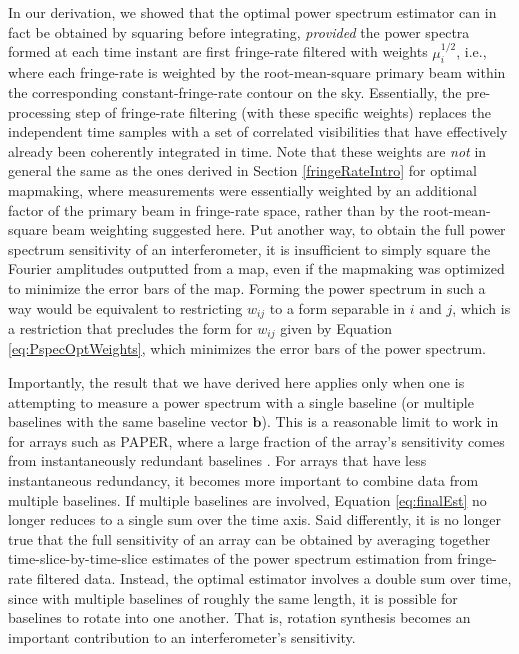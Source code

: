 \documentclass[twocolumn,apj,numberedappendix]{emulateapj}
\begin{document}
In our derivation, we showed that the optimal power spectrum estimator can in fact be obtained by squaring before integrating, \emph{provided} the power spectra formed at each time instant are first fringe-rate filtered with weights $ \mu_i^{1/2}$, i.e., where each fringe-rate is weighted by the root-mean-square primary beam within the corresponding constant-fringe-rate contour on the sky. Essentially, the pre-processing step of fringe-rate filtering (with these specific weights) replaces the independent time samples with a set of correlated visibilities that have effectively already been coherently integrated in time. Note that these weights are \emph{not} in general the same as the ones derived in Section \ref{fringeRateIntro} for optimal mapmaking, where measurements were essentially weighted by an additional factor of the primary beam in fringe-rate space, rather than by the root-mean-square beam weighting suggested here. Put another way, to obtain the full power spectrum sensitivity of an interferometer, it is insufficient
to simply square the Fourier amplitudes outputted from a map, even if the mapmaking was optimized to minimize the error bars of the map.  Forming the power spectrum in such a way would be equivalent to restricting $w_{ij}$ to a form separable in $i$ and $j$, which is a restriction that precludes the form for $w_{ij}$ given by Equation \ref{eq:PspecOptWeights}, which minimizes the error bars of the power spectrum.

Importantly, the result that we have derived here applies only when one is attempting to measure a power spectrum with a single baseline (or multiple baselines with the same baseline vector $\mathbf{b}$). This is a reasonable limit to work in for arrays such as PAPER, where a large fraction of the array's sensitivity comes from instantaneously redundant baselines \citep{parsons_et_al2012a}. For arrays that have less instantaneous redundancy, it becomes more important to combine data from multiple baselines. If multiple baselines are involved, Equation \eqref{eq:finalEst} no longer reduces to a single sum over the time axis. Said differently, it is no longer true that the full sensitivity of an array can be obtained by averaging together time-slice-by-time-slice estimates of the power spectrum estimation from fringe-rate filtered data. Instead, the optimal estimator involves a double sum over time, since with multiple baselines of roughly the same length, it is possible for baselines to rotate into one another. That is, rotation synthesis becomes an important contribution to an interferometer's sensitivity.
\end{document}
